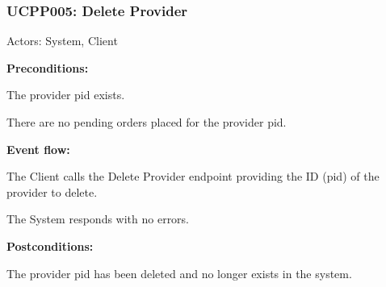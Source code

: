 \begin{ucbox}{\subsubsection{UCPP005: Delete Provider}}
\label{UCPP005}

Actors: System, Client

\textbf{Preconditions:}

\ucitem The provider pid exists.

\ucitem There are no pending orders placed for the provider pid.

\textbf{Event flow:}

\ucitem The Client calls the Delete Provider endpoint providing the ID (pid) of the provider to delete.

\ucitem The System responds with no errors.

\textbf{Postconditions:}

\ucitem The provider pid has been deleted and no longer exists in the system.

\end{ucbox}
\newpage